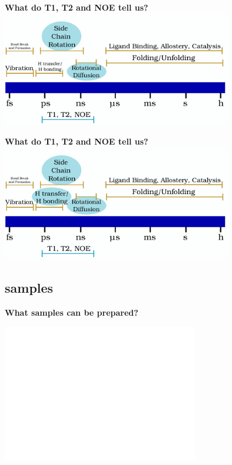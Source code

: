 \documentclass{beamer}
\begin{document}
\addtocounter{framenumber}{-1}
\begin{frame}
\begin{center}
\Large{\centering
\textbf{What do T1, T2 and NOE tell us?} \\}
\includegraphics[height=5cm]{dynam2.pdf}
\end{center}
\end{frame}


\addtocounter{framenumber}{-1}
\begin{frame}
\begin{center}
\Large{\centering
\textbf{What do T1, T2 and NOE tell us?} \\}
\includegraphics[height=5cm]{dynam3.pdf}
\end{center}
\end{frame}


\subsection{samples}


\begin{frame}
\begin{center}
\Large{\centering
\textbf{What samples can be prepared?} \\}

\vspace{0.5cm}

\includegraphics[height=6cm]{plots/samples0.pdf}
\end{center}
\end{frame}
\end{document}
